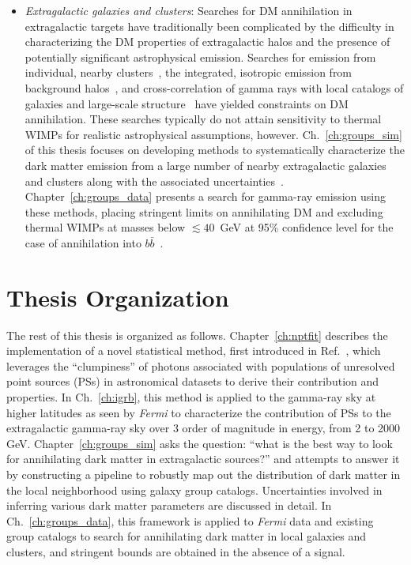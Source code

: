 \begin{itemize}
\item \emph{Extragalactic galaxies and clusters}: Searches for DM annihilation in extragalactic targets have traditionally been complicated by the difficulty in characterizing the DM properties of extragalactic halos and the presence of potentially significant astrophysical emission. Searches for emission from individual, nearby clusters~\cite{Ackermann:2015fdi}, the integrated, isotropic emission from background halos~\cite{Ackermann:2015tah,Ajello:2015mfa,Cholis:2013ena,DiMauro:2015tfa}, and cross-correlation of gamma rays with local catalogs of galaxies and large-scale structure~\cite{Ando:2013xwa,Ando:2014aoa,Ando:2016ang,Cuoco:2015rfa,Regis:2015zka,Xia:2015wka} have yielded constraints on DM annihilation. These searches typically do not attain sensitivity to thermal WIMPs for realistic astrophysical assumptions, however. Ch.~\ref{ch:groups_sim} of this thesis focuses on developing methods to systematically characterize the dark matter emission from a large number of nearby extragalactic galaxies and clusters along with the associated uncertainties~\cite{Lisanti:2017qoz}. Chapter~\ref{ch:groups_data} presents a search for gamma-ray emission using these methods, placing stringent limits on annihilating DM and excluding thermal WIMPs at masses below $\lesssim 40$~GeV at 95\% confidence level for the case of annihilation into $b\bar b$~\cite{Lisanti:2017qlb}. 
\end{itemize}

\section{Thesis Organization}
\label{sec:summary}

The rest of this thesis is organized as follows. Chapter~\ref{ch:nptfit} describes the implementation of a novel statistical method, first introduced in Ref.~\cite{Lee:2015fea}, which leverages the ``clumpiness'' of photons associated with populations of unresolved point sources (PSs) in astronomical datasets to derive their contribution and properties. In Ch.~\ref{ch:igrb}, this method is applied to the gamma-ray sky at higher latitudes as seen by \emph{Fermi} to characterize the contribution of PSs to the extragalactic gamma-ray sky over 3 order of magnitude in energy, from 2 to 2000 GeV. Chapter~\ref{ch:groups_sim} asks the question: ``what is the best way to look for annihilating dark matter in extragalactic sources?'' and attempts to answer it by constructing a pipeline to robustly map out the distribution of dark matter in the local neighborhood using galaxy group catalogs. Uncertainties involved in inferring various dark matter parameters are discussed in detail. In Ch.~\ref{ch:groups_data}, this framework is applied to \emph{Fermi} data and existing group catalogs to search for annihilating dark matter in local galaxies and clusters, and stringent bounds are obtained in the absence of a signal. 


